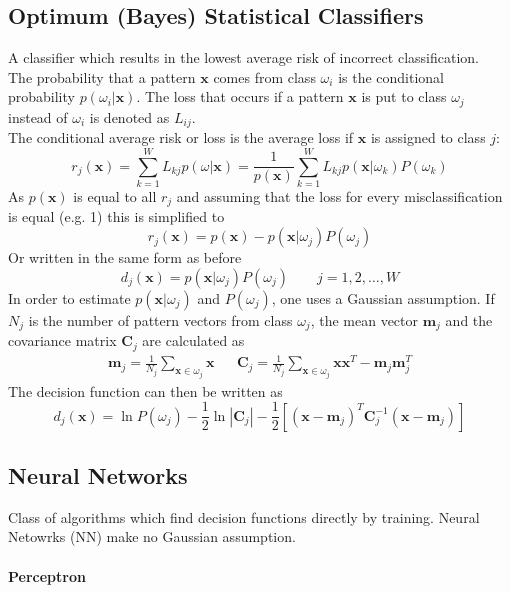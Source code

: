 \subsection{Optimum (Bayes) Statistical Classifiers}
A classifier which results in the lowest average risk of incorrect classification. \\

The probability that a pattern $\mathbf{x}$ comes from class $\omega_i$ is the conditional probability $p(\omega_i | \mathbf{x})$.
The loss that occurs if a pattern $\mathbf{x}$ is put to class $\omega_j$ instead of $\omega_i$ is denoted as $L_{ij}$. \\

The conditional average risk or loss is the average loss if $\mathbf{x}$ is assigned to class $j$:
	\[
		r_j(\mathbf{x}) = \sum\limits_{k=1}^{W} L_{kj} p(\omega | \mathbf{x}) = \frac{1}{p(\mathbf{x})} \sum\limits_{k=1}^{W} L_{kj} p(\mathbf{x} | \omega_k) P(\omega_k)
	\]
As $p(\mathbf{x})$ is equal to all $r_j$ and assuming that the loss for every misclassification is equal (e.g. 1) this is simplified to
	\[
		r_j(\mathbf{x}) = p(\mathbf{x}) - p(\mathbf{x} | \omega_j) P(\omega_j)
	\]
Or written in the same form as before
	\[
		d_j(\mathbf{x}) = p(\mathbf{x} | \omega_j) P(\omega_j)	\qquad j=1,2,\ldots,W
	\]
In order to estimate $p(\mathbf{x}|\omega_j)$ and $P(\omega_j)$, one uses a Gaussian assumption.
If $N_j$ is the number of pattern vectors from class $\omega_j$, the mean vector $\mathbf{m}_j$ and the covariance matrix $\mathbf{C}_j$ are calculated as
\begin{align*}
	\mathbf{m}_j = \frac{1}{N_j} \sum\limits_{\mathbf{x}\in\omega_j} \mathbf{x}
	&&
	\mathbf{C}_j = \frac{1}{N_j} \sum\limits_{\mathbf{x}\in\omega_j} \mathbf{x}\mathbf{x}^T - \mathbf{m}_j\mathbf{m}_j^T
\end{align*}
The decision function can then be written as
	\[
		d_j(\mathbf{x}) = \ln P(\omega_j) - \frac{1}{2}\ln|\mathbf{C}_j| - \frac{1}{2}\left[(\mathbf{x}-\mathbf{m}_j)^T\mathbf{C}_j^{-1}(\mathbf{x}-\mathbf{m}_j)\right]
	\]

\subsection{Neural Networks}

Class of algorithms which find decision functions directly by training. Neural Netowrks (NN) make no Gaussian assumption.

\paragraph{Perceptron}

